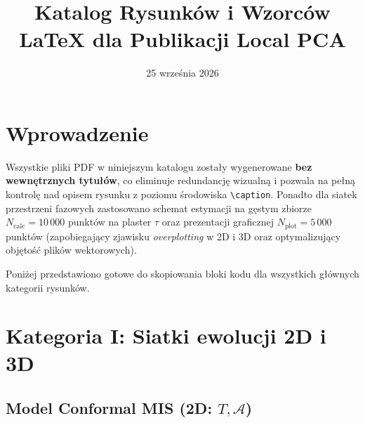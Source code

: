 \documentclass[11pt,a4paper]{article}
\title{\textbf{Katalog Rysunków i Wzorców LaTeX dla Publikacji Local PCA}}
\date{25 września 2026}
\begin{document}
\maketitle

\tableofcontents
\newpage

\section{Wprowadzenie}
Wszystkie pliki PDF w niniejszym katalogu zostały wygenerowane \textbf{bez wewnętrznych tytułów}, co eliminuje redundancję wizualną i pozwala na pełną kontrolę nad opisem rysunku z poziomu środowiska \texttt{\textbackslash caption}. Ponadto dla siatek przestrzeni fazowych zastosowano schemat estymacji na gęstym zbiorze $N_{\text{calc}} = 10\,000$ punktów na plaster $\tau$ oraz prezentacji graficznej $N_{\text{plot}} = 5\,000$ punktów (zapobiegający zjawisku \emph{overplotting} w 2D i 3D oraz optymalizujący objętość plików wektorowych).

Poniżej przedstawiono gotowe do skopiowania bloki kodu dla wszystkich głównych kategorii rysunków.

\section{Kategoria I: Siatki ewolucji 2D i 3D}

\subsection{Model Conformal MIS (2D: $T, \mathcal{A}$)}
\end{document}

